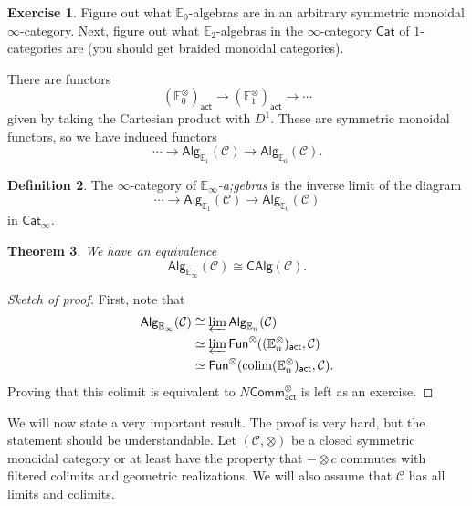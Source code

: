 \documentclass[10pt, oneside]{memoir}
\newtheorem{thm}{Theorem}[subsection]
\theoremstyle{definition}
\newtheorem{defn}[thm]{Definition}
\newtheorem{exer}[thm]{Exercise}
\theoremstyle{remark}
\theoremstyle{plain}
\theoremstyle{definition}
\theoremstyle{remark}
\newcommand{\E}{\mathbb{E}}
\newcommand{\mc}[1]{\mathcal{#1}}
\newcommand{\ms}[1]{\mathsf{#1}}
\newcommand{\1}{\mathbf{1}}
\newcommand{\2}{\mathbf{2}}
\newcommand{\3}{\mathbf{3}}
\DeclareMathOperator*{\colim}{colim}
\begin{document}
\begin{exer}
    Figure out what \(\E_0 \)-algebras are in an arbitrary symmetric monoidal \(\infty \)-category. Next, figure out what \(\E_2 \)-algebras in the \(\infty \)-category \(\ms{Cat} \) of \(1 \)-categories are (you should get braided monoidal categories).
\end{exer}

There are functors
\[ (\E_0^{\otimes})_{\ms{act}} \to (\E_1^{\otimes})_{\ms{act}} \to \cdots \]
given by taking the Cartesian product with \(D^1 \). These are symmetric monoidal functors, so we have induced functors
\[ \cdots \to \ms{Alg}_{\E_1}(\mc{C}) \to \ms{Alg}_{\E_0}(\mc{C}). \]

\begin{defn}
    The \(\infty \)-category of \textit{\(\E_{\infty} \)-a;gebras} is the inverse limit of the diagram
    \[ \cdots \to \ms{Alg}_{\E_1}(\mc{C}) \to \ms{Alg}_{\E_0}(\mc{C}) \]
    in \(\ms{Cat}_{\infty} \).
\end{defn}

\begin{thm}
    We have an equivalence
    \[ \ms{Alg}_{\E_{\infty}}(\mc{C}) \cong \ms{CAlg}(\mc{C}). \]
\end{thm}

\begin{proof}[Sketch of proof]
    First, note that
    \begin{align*}
        \ms{Alg}_{\E_{\infty}}(\mc{C}) &\cong \varprojlim \ms{Alg}_{\E_n}(\mc{C}) \\
        &\simeq \varprojlim \ms{Fun}^{\otimes}((\E_n^{\otimes})_{\ms{act}}, \mc{C}) \\
        &\simeq \ms{Fun}^{\otimes} (\colim (\E_n^{\otimes})_{\ms{act}}, \mc{C}).
    \end{align*}
    Proving that this colimit is equivalent to \(N \ms{Comm}_{\ms{act}}^{\otimes} \) is left as an exercise.
\end{proof}

We will now state a very important result. The proof is very hard, but the statement should be understandable. Let \((\mc{C}, \otimes) \) be a closed symmetric monoidal category or at least have the property that \(-\otimes c \) commutes with filtered colimits and geometric realizations. We will also assume that \(\mc{C} \) has all limits and colimits.
\end{document}
